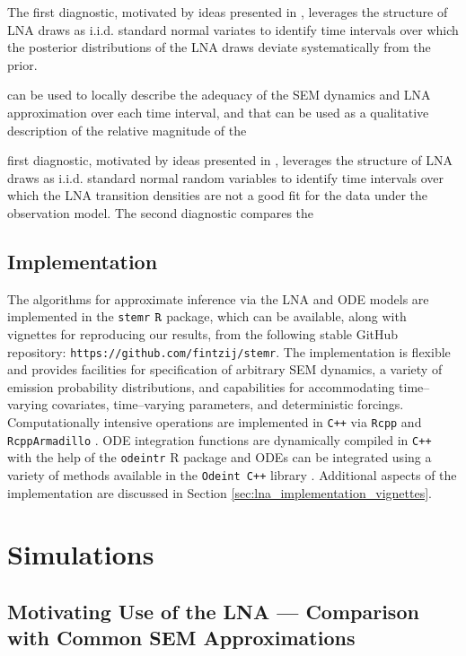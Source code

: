 The first diagnostic, motivated by ideas presented in \cite{lau2014new}, leverages the structure of LNA draws as i.i.d. standard normal variates to identify time intervals over which the posterior distributions of the LNA draws deviate systematically from the prior. 

can be used to locally describe the adequacy of the SEM dynamics and LNA approximation over each time interval, and that can be used as a qualitative description of the relative magnitude of the 

 first diagnostic, motivated by ideas presented in \cite{lau2014new}, leverages the structure of LNA draws as i.i.d. standard normal random variables to identify time intervals over which the LNA transition densities are not a good fit for the data under the observation model. The second diagnostic compares the 

\subsection{Implementation}
\label{subsec:lna_implementation}
The algorithms for approximate inference via the LNA and ODE models are implemented in the \texttt{stemr} $ \mathtt{R} $ package, which can be available, along with vignettes for reproducing our results, from the following stable GitHub repository: \texttt{https://github.com/fintzij/stemr}. The implementation is flexible and provides facilities for specification of arbitrary SEM dynamics, a variety of emission probability distributions, and capabilities for accommodating time--varying covariates, time--varying parameters, and deterministic forcings. Computationally intensive operations are implemented in \texttt{C++} via \texttt{Rcpp} and \texttt{RcppArmadillo} \cite{rcpp,rcpparmadillo}. ODE integration functions are dynamically compiled in \texttt{C++} with the help of the \texttt{odeintr} R package \cite{odeintr} and ODEs can be integrated using a variety of methods available in the \texttt{Odeint C++} library \cite{ahnert2011odeint}. Additional aspects of the implementation are discussed in Section \ref{sec:lna_implementation_vignettes}.

\section{Simulations}
\label{sec:lna_simulations}

\subsection{Motivating Use of the LNA --- Comparison with Common SEM Approximations}
\label{subsec:lna_coverage}

